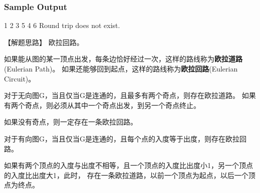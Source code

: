 \subsubsection{Sample Output}
\begin{Code}
    1 2 3 5 4 6
    Round trip does not exist.
\end{Code}

【解题思路】
欧拉回路。

如果能从图的某一顶点出发，每条边恰好经过一次，这样的路线称为\textbf{欧拉道路}(Eulerian Path)。
如果还能够回到起点，这样的路线称为\textbf{欧拉回路}(Eulerian Circuit)。

对于无向图G，当且仅当G是连通的，且最多有两个奇点，则存在欧拉道路。
如果有两个奇点，则必须从其中一个奇点出发，到另一个奇点终止。

如果没有奇点，则一定存在一条欧拉回路。

对于有向图G，当且仅当G是连通的，且每个点的入度等于出度，则存在欧拉回路。

如果有两个顶点的入度与出度不相等，且一个顶点的入度比出度小1，另一个顶点的入度比出度大1，此时，
存在一条欧拉道路，以前一个顶点为起点，以后一个顶点为终点。



